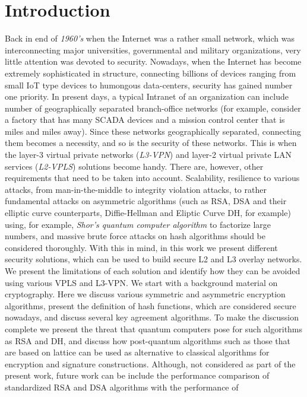 \chapter{Introduction}

Back in end of {\it 1960’s} when the Internet was a rather small 
network, which was interconnecting major universities, governmental 
and military organizations, very little attention was devoted to 
security. Nowadays, when the Internet has become extremely 
sophisticated in structure, connecting billions of devices ranging 
from small IoT type devices to humongous data-centers, security has 
gained number one priority. In present days, a typical Intranet of 
an organization can include number of geographically separated 
branch-office networks (for example, consider a factory that has 
many SCADA devices and a mission control center that is miles and 
miles away). Since these networks geographically separated, connecting 
them becomes a necessity, and so is the security of these networks. 
This is when the layer-3 virtual private networks ({\it L3-VPN}) and layer-2 
virtual private LAN services ({\it L2-VPLS}) solutions become handy. 
There are, however, other requirements that need to be taken into 
account. Scalability, resilience to various attacks, from man-in-the-middle 
to integrity violation attacks, to rather fundamental attacks on 
asymmetric algorithms (such as RSA, DSA and their elliptic curve 
counterparts, Diffie-Hellman and Eliptic Curve DH, for example) 
using, for example, {\it Shor’s quantum computer algorithm} to factorize 
large numbers, and massive brute force attacks on hash algorithms 
should be considered thoroughly. With this in mind, in this work we 
present different security solutions, which can be used to build secure 
L2 and L3 overlay networks. We present the limitations of each solution 
and identify how they can be avoided using various VPLS and L3-VPN.
We start with a background material on cryptography. 
Here we discuss various symmetric and asymmetric encryption algorithms, 
present the definition of hash functions, which are considered secure nowadays, 
and discuss several key agreement algorithms. To make the discussion 
complete we present the threat that quantum computers pose for such 
algorithms as RSA and DH, and discuss how post-quantum algorithms such 
as those that are based on lattice can be used as alternative to classical 
algorithms for encryption and signature constructions. Although, not considered 
as part of the present work, future work can be include the performance 
comparison of standardized RSA and DSA algorithms with the performance of 
